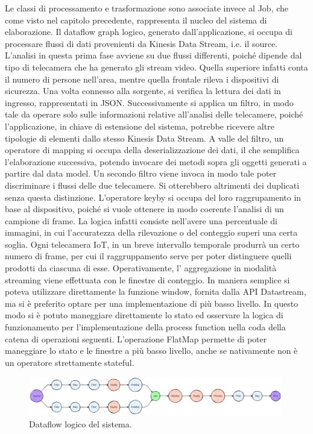 Le classi di processamento e trasformazione sono associate invece al Job, che come visto nel capitolo precedente, rappresenta il nucleo del sistema di elaborazione. Il dataflow graph logico, generato dall'applicazione, si occupa di processare flussi di dati provenienti da Kinesis Data Stream, i.e. il source. L'analisi in questa prima fase avviene su due flussi differenti, poiché  dipende dal tipo di telecamera che ha generato gli stream video. Quella superiore infatti conta il numero di persone nell'area, mentre quella frontale rileva i dispositivi di sicurezza. Una volta connesso alla sorgente, si verifica la lettura dei dati in ingresso, rappresentati in JSON. Successivamente si applica un filtro, in modo tale da operare solo sulle informazioni relative all'analisi delle telecamere, poiché l'applicazione, in chiave di estensione del sistema, potrebbe ricevere altre tipologie di elementi dallo stesso Kinesis Data Stream. A valle del filtro, un operatore di mapping si occupa della deserializzazione dei dati, il che semplifica l'elaborazione successiva, potendo invocare dei metodi sopra gli oggetti generati a partire dal data model. Un secondo filtro viene invoca in modo tale poter discriminare i flussi delle due telecamere. Si otterebbero altrimenti dei duplicati senza questa distinzione. L'operatore keyby si occupa del loro raggrupamento in base al dispositivo, poiché si vuole ottenere in modo coerente l'analisi di un campione di frame. La logica infatti consiste nell'avere una percentuale di immagini, in cui l'accuratezza della rilevazione o del conteggio superi una certa soglia. Ogni telecamera IoT, in un breve intervallo temporale produrrà un certo numero di frame, per cui il raggruppamento serve per poter distinguere quelli prodotti da ciascuna di esse. Operativamente, l' aggregazione in modalità streaming viene effettuata con le finestre di conteggio. In maniera semplice si poteva utilizzare direttamente la funzione window, fornita dalla API Datastream, ma si è preferito optare per una implementazione di più basso livello. In questo modo si è potuto maneggiare direttamente lo stato ed osservare la logica di funzionamento per l'implementazione della process function nella coda della catena di operazioni seguenti. L'operazione FlatMap permette di poter maneggiare lo stato e le finestre a più basso livello, anche se nativamente non è un operatore strettamente stateful. 

\vspace{0.5cm}
\begin{figure}[htbp]
    \centering
    \includegraphics[width=0.99\textwidth]{figures/system-logical-dataflow-graph.png}
    \caption{Dataflow logico del sistema.} 
    \label{fig:system-dataflow}
\end{figure}

